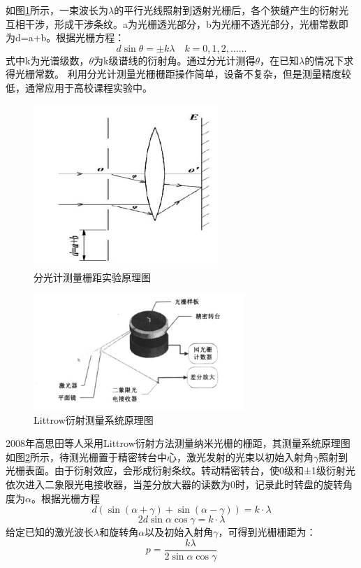 \documentclass[type=master,oneside]{fduthesis}
\begin{document}
如图\ref{fig:分光计测量栅距实验原理图}所示，一束波长为$\lambda $的平行光线照射到透射光栅后，各个狭缝产生的衍射光互相干涉，形成干涉条纹。a为光栅透光部分，b为光栅不透光部分，光栅常数即为d=a+b。根据光栅方程：
\begin{equation}
  d \sin \theta =\pm k \lambda \quad k=0,1,2, \ldots \ldots
\end{equation}
式中k为光谱级数，$\theta $为k级谱线的衍射角。通过分光计测得$\theta $，在已知$\lambda $的情况下求得光栅常数。
利用分光计测量光栅栅距\cite{倪重文2008分光计测定光栅常数,王小羊2018光栅常数测定方法探讨}操作简单，设备不复杂，但是测量精度较低，通常应用于高校课程实验中。
\begin{figure}[htb]
  \centering
  \includegraphics[width=7cm]{1-fig/分光计.jpg}
  \caption{分光计测量栅距实验原理图}
  \label{fig:分光计测量栅距实验原理图}
\end{figure}


\begin{figure}[htb]
  \centering
  \includegraphics[width=8cm]{1-fig/Littrow衍射.jpg}
  \caption{Littrow衍射测量系统原理图}
  \label{fig:Littrow衍射测量系统原理图}
\end{figure}

2008年高思田等人采用Littrow衍射方法\cite{高思田2008纳米光栅栅距的精确测量与,lv2019fast}测量纳米光栅的栅距，其测量系统原理图如图\ref{fig:Littrow衍射测量系统原理图}所示，待测光栅置于精密转台中心，激光发射的光束以初始入射角$ \gamma $照射到光栅表面。由于衍射效应，会形成衍射条纹。转动精密转台，使0级和±1级衍射光依次进入二象限光电接收器，当差分放大器的读数为0时，记录此时转盘的旋转角度为$ \alpha $。根据光栅方程
\begin{equation}
  d(\sin (\alpha+\gamma )+\sin (\alpha- \gamma ))=k \cdot \lambda
\end{equation}
\begin{equation}
  2d \sin\alpha \cos\gamma  =k \cdot \lambda
\end{equation}
给定已知的激光波长$ \lambda $和旋转角$\alpha  $以及初始入射角$\gamma  $，可得到光栅栅距为：
\begin{equation}
  p=\frac{k \lambda}{2 \sin \alpha \cos \gamma}
\end{equation}
\end{document}
